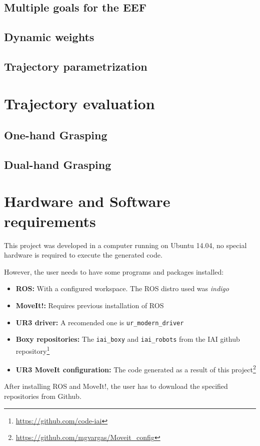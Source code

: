 \subsection{Multiple goals for the EEF}
\subsection{Dynamic weights}
\subsection{Trajectory parametrization}
\section{Trajectory evaluation}
\subsection{One-hand Grasping}
\subsection{Dual-hand Grasping}

\section{Hardware and Software requirements}
\label{subsec:software}

This project was developed in a computer running on Ubuntu 14.04, no special hardware is required to execute the generated code.

However, the user needs to have some programs and packages installed: 
\begin{itemize}
	\item \textbf{ROS:} With a configured workspace. The ROS distro used was \textit{indigo}
	\item \textbf{MoveIt!:} Requires previous installation of ROS
	\item \textbf{UR3 driver:} A recomended one is \texttt{ur\_modern\_driver}
	\item \textbf{Boxy repositories:} The \texttt{iai\_boxy} and \texttt{iai\_robots} from the IAI github repository\footnote{\url{https://github.com/code-iai}}
	\item \textbf{UR3 MoveIt configuration:} The code generated as a result of this project\footnote{\url{https://github.com/mgvargas/Moveit_config}}
\end{itemize}


After installing ROS and MoveIt!, the user has to download the specified repositories from Github. 

